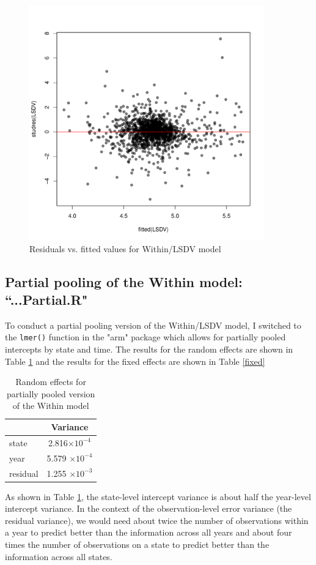 \documentclass{article}
\begin{document}
\begin{figure}[H]
\centering
\includegraphics[width = 4in]{figures/residuals3.pdf}
\caption{Residuals vs. fitted values for Within/LSDV model}
\label{within residuals}
\end{figure}

\subsection{Partial pooling of the Within model: ``...Partial.R"}
To conduct a partial pooling version of the Within/LSDV model, I switched to the \verb|lmer()| function in the "arm" package which allows for partially pooled intercepts by state and time. The results for the random effects are shown in Table \ref{random} and the results for the fixed effects are shown in Table \ref{fixed}

\begin{table}[H]
\centering
\caption{Random effects for partially pooled version of the Within model}
\label{random}
\begin{tabular}{@{}  l c @{}}
& \textbf{Variance} \\\midrule
state  & 2.816$\times 10^{-4}$\\ 
 year   & 5.579 $\times 10^{-4}$\\
residual & 1.255 $\times 10^{-3}$\\
\bottomrule
\hline
\end{tabular}
\end{table}

As shown in Table \ref{random}, the state-level intercept variance is about half the year-level intercept variance. In the context of the observation-level error variance (the residual variance), we would need about twice the number of observations within a year to predict better than the information across all years and about four times the number of observations on a state to predict better than the information across all states. 
\end{document}
